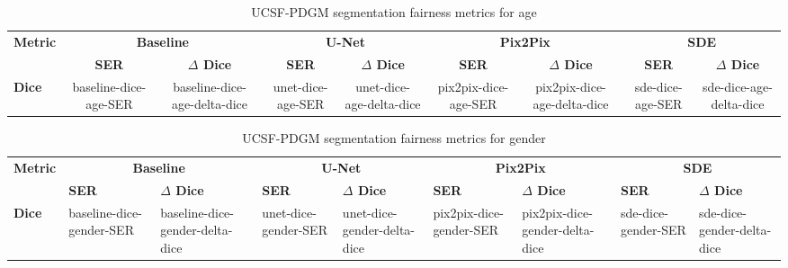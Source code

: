     \begin{table}[]
        \centering
        \caption{UCSF-PDGM segmentation fairness metrics for age}\label{tab:ucsf_age_seg}
        \begin{tabular}{l|cccccccc}
        \hline
        \multirow{2}{*}{\textbf{Metric}} & \multicolumn{2}{c|}{\textbf{Baseline}}                   & \multicolumn{2}{c|}{\textbf{U-Net}}                              & \multicolumn{2}{c|}{\textbf{Pix2Pix}}                              & \multicolumn{2}{c}{\textbf{SDE}}    \\ \cline{2-9}
                                                                                            & \textbf{SER} & \textbf{$\Delta$ Dice}  & \textbf{SER} & \textbf{$\Delta$ Dice}  & \textbf{SER} & \textbf{$\Delta$ Dice} & \textbf{SER} & \textbf{$\Delta$ Dice} \\ \hline
                                                                    \textbf{Dice}  & baseline-dice-age-SER & baseline-dice-age-delta-dice & unet-dice-age-SER & unet-dice-age-delta-dice & pix2pix-dice-age-SER & pix2pix-dice-age-delta-dice & sde-dice-age-SER & sde-dice-age-delta-dice \\ \hline
        \end{tabular}
        \end{table}

    \begin{table}[]
        \centering
        \caption{UCSF-PDGM segmentation fairness metrics for gender}\label{tab:ucsf_gender_seg}
        \begin{tabular}{l|llllllll}
        \hline
        \multirow{2}{*}{\textbf{Metric}} & \multicolumn{2}{c|}{\textbf{Baseline}}                   & \multicolumn{2}{c|}{\textbf{U-Net}}                              & \multicolumn{2}{c|}{\textbf{Pix2Pix}}                              & \multicolumn{2}{c}{\textbf{SDE}}    \\ \cline{2-9}
                                                                                            & \textbf{SER} & \textbf{$\Delta$ Dice}  & \textbf{SER} & \textbf{$\Delta$ Dice}  & \textbf{SER} & \textbf{$\Delta$ Dice} & \textbf{SER} & \textbf{$\Delta$ Dice} \\ \hline
                                                                    \textbf{Dice}  & baseline-dice-gender-SER & baseline-dice-gender-delta-dice & unet-dice-gender-SER & unet-dice-gender-delta-dice & pix2pix-dice-gender-SER & pix2pix-dice-gender-delta-dice & sde-dice-gender-SER & sde-dice-gender-delta-dice \\ \hline
        \end{tabular}
        \end{table}